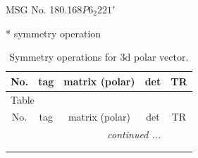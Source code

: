 \documentclass[fleqn,8pt]{jsarticle}
\begin{document}
\setcounter{MaxMatrixCols}{32}

\renewcommand{\tablename}{Table~}
\renewcommand{\figurename}{Figure~}
\begin{center}
\LARGE
MSG No. 180.168\quad$P6_{2}221'$
\end{center}
* symmetry operation
\renewcommand{\arraystretch}{1.3}
\begin{longtable}{ccccc}
\caption{Symmetry operations for 3d polar vector.}
 \\
 \hline \hline
No. & tag & matrix (polar) & det & TR \\ \hline \endfirsthead

\multicolumn{4}{l}{\tablename\ \thetable{}} \\
 \hline \hline
No. & tag & matrix (polar) & det & TR \\ \hline \endhead

 \hline \hline
\multicolumn{4}{r}{\footnotesize\it continued ...} \\ \endfoot

 \hline \hline
\multicolumn{4}{r}{} \\ \endlastfoot


\end{longtable}
\end{document}
